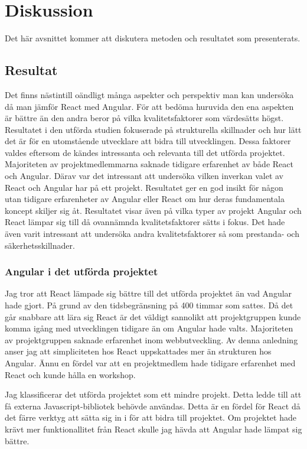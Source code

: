 \section{Diskussion}
\label{sec:axel-discussion}
Det här avsnittet kommer att diskutera metoden och resultatet som presenterats. 

\subsection{Resultat}
\label{subsec:axel-discussion-results}
Det finns nästintill oändligt många aspekter och perspektiv man kan undersöka då man jämför React med Angular. För att bedöma huruvida den ena aspekten är bättre än den andra beror på vilka kvalitetsfaktorer som värdesätts högst. Resultatet i den utförda studien fokuserade på strukturella skillnader och hur lätt det är för en utomstående utvecklare att bidra till utvecklingen. Dessa faktorer valdes eftersom de kändes intressanta och relevanta till det utförda projektet. Majoriteten av projektmedlemmarna saknade tidigare erfarenhet av både React och Angular. Därav var det intressant att undersöka vilken inverkan valet av React och Angular har på ett projekt. Resultatet ger en god insikt för någon utan tidigare erfarenheter av Angular eller React om hur deras fundamentala koncept skiljer sig åt. Resultatet visar även på vilka typer av projekt Angular och React lämpar sig till då ovannämnda kvalitetsfaktorer sätts i fokus. Det hade även varit intressant att undersöka andra kvalitetsfaktorer så som prestanda- och säkerhetsskillnader.

\subsubsection{Angular i det utförda projektet}
Jag tror att React lämpade sig bättre till det utförda projektet än vad Angular hade gjort. På grund av den tidsbegränsning på 400 timmar som sattes. Då det går snabbare att lära sig React är det väldigt sannolikt att projektgruppen kunde komma igång med utvecklingen tidigare än om Angular hade valts. Majoriteten av projektgruppen saknade erfarenhet inom webbutveckling. Av denna anledning anser jag att simpliciteten hos React uppskattades mer än strukturen hos Angular. Ännu en fördel var att en projektmedlem hade tidigare erfarenhet med React och kunde hålla en workshop. 

Jag klassificerar det utförda projektet som ett mindre projekt. Detta ledde till att få externa Javascript-bibliotek behövde användas. Detta är en fördel för React då det färre verktyg att sätta sig in i för att bidra till projektet. Om projektet hade krävt mer funktionallitet från React skulle jag hävda att Angular hade lämpat sig bättre.

